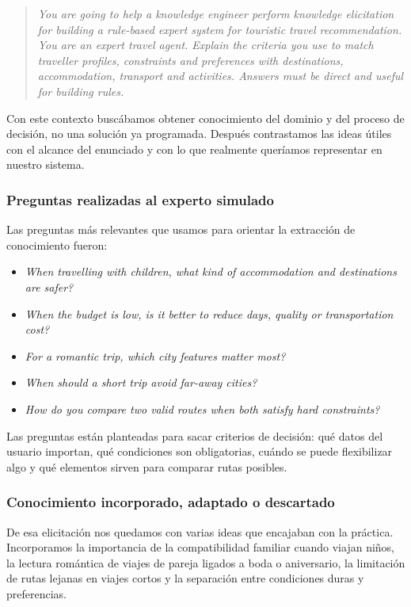 \documentclass[11pt,a4paper]{article}
\begin{document}
\begin{quote}
\small\itshape You are going to help a knowledge engineer perform knowledge
elicitation for building a rule-based expert system for touristic travel
recommendation. You are an expert travel agent. Explain the criteria you use
to match traveller profiles, constraints and preferences with destinations,
accommodation, transport and activities. Answers must be direct and useful for
building rules.
\end{quote}

Con este contexto busc\'abamos obtener conocimiento del dominio y del proceso de
decisi\'on, no una soluci\'on ya programada. Despu\'es contrastamos las ideas
\'utiles con el alcance del enunciado y con lo que realmente quer\'iamos
representar en nuestro sistema.

\subsubsection{Preguntas realizadas al experto simulado}
Las preguntas m\'as relevantes que usamos para orientar la extracci\'on de
conocimiento fueron:
\begin{itemize}
    \item \textit{When travelling with children, what kind of accommodation
    and destinations are safer?}
    \item \textit{When the budget is low, is it better to reduce days, quality
    or transportation cost?}
    \item \textit{For a romantic trip, which city features matter most?}
    \item \textit{When should a short trip avoid far-away cities?}
    \item \textit{How do you compare two valid routes when both satisfy hard
    constraints?}
\end{itemize}

Las preguntas est\'an planteadas para sacar criterios de decisi\'on: qu\'e datos
del usuario importan, qu\'e condiciones son obligatorias, cu\'ando se puede
flexibilizar algo y qu\'e elementos sirven para comparar rutas posibles.

\subsubsection{Conocimiento incorporado, adaptado o descartado}
De esa elicitaci\'on nos quedamos con varias ideas que encajaban con la
pr\'actica. Incorporamos la importancia de la compatibilidad familiar cuando
viajan ni\~nos, la lectura rom\'antica de viajes de pareja ligados a boda o
aniversario, la limitaci\'on de rutas lejanas en viajes cortos y la separaci\'on
entre condiciones duras y preferencias.
\end{document}
